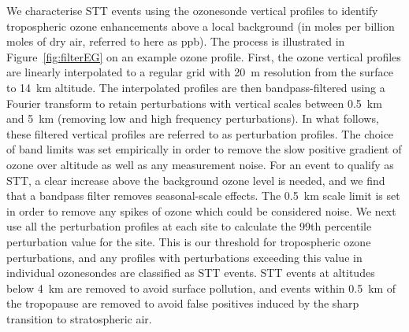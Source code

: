     We characterise STT events using the ozonesonde vertical profiles to identify tropospheric ozone enhancements above a local background (in moles per billion moles of dry air, referred to here as ppb).
    The process is illustrated in Figure~\ref{fig:filterEG} on an example ozone profile.
    First, the ozone vertical profiles are linearly interpolated to a regular grid with 20~m resolution from the surface to 14~km altitude. 
    The interpolated profiles are then bandpass-filtered using a Fourier transform to retain perturbations with vertical scales between 0.5~km and 5~km (removing low and high frequency perturbations).
    In what follows, these filtered vertical profiles are referred to as perturbation profiles.
    The choice of band limits was set empirically in order to remove the slow positive gradient of ozone over altitude as well as any measurement noise.
    For an event to qualify as STT, a clear increase above the background ozone level is needed, and we find that a bandpass filter removes seasonal-scale effects.
    The 0.5~km scale limit is set in order to remove any spikes of ozone which could be considered noise.
    We next use all the perturbation profiles at each site to calculate the 99th percentile perturbation value for the site.
    This is our threshold for tropospheric ozone perturbations, and any profiles with perturbations exceeding this value in individual ozonesondes are classified as STT events.
    STT events at altitudes below 4~km are removed to avoid surface pollution, and events within 0.5~km of the tropopause are removed to avoid false positives induced by the sharp transition to stratospheric air.
    
